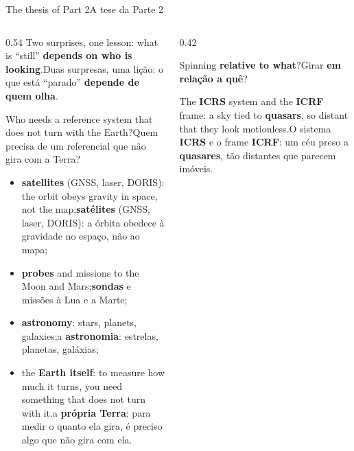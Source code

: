 \documentclass[aspectratio=169,11pt]{beamer}
\newcommand{\tr}[2]{\ifEN#2\else#1\fi}
\newcommand{\bnum}[1]{\textbf{\textcolor{mTeal}{#1}}}
\newcommand{\sist}[1]{\textcolor{corSist}{\textbf{#1}}}
\newcommand{\fram}[1]{\textcolor{corFrame}{\textbf{#1}}}
\begin{document}
\begin{frame}{\tr{A tese da Parte 2}{The thesis of Part 2}}
  \begin{columns}[T]
    \begin{column}{0.54\textwidth}
      \tr{Duas surpresas, uma lição: o que está ``parado'' \bnum{depende de quem olha}.}{Two
      surprises, one lesson: what is ``still'' \bnum{depends on who is looking}.}
      \medskip

      \tr{Quem precisa de um referencial que \alert{não gira com a Terra}?}{Who needs a reference
      system that \alert{does not turn with the Earth}?}
      \small
      \begin{itemize}
        \setlength{\itemsep}{1pt}
        \item \tr{\textbf{satélites} (GNSS, laser, DORIS): a órbita obedece à gravidade no
              espaço, não ao mapa;}{\textbf{satellites} (GNSS, laser, DORIS): the orbit obeys
              gravity in space, not the map;}
        \item \tr{\textbf{sondas} e missões à Lua e a Marte;}{\textbf{probes} and missions to
              the Moon and Mars;}
        \item \tr{a \textbf{astronomia}: estrelas, planetas, galáxias;}{\textbf{astronomy}:
              stars, planets, galaxies;}
        \item \tr{a \textbf{própria Terra}: para medir o quanto ela gira, é preciso algo que
              não gira com ela.}{the \textbf{Earth itself}: to measure how much it turns, you
              need something that does not turn with it.}
      \end{itemize}
    \end{column}
    \begin{column}{0.42\textwidth}
      \begin{regra}[title={\tr{A pergunta que organiza as quatro aulas}{The question that
        organizes the four classes}}]
        \centering\large \tr{Girar \textbf{em relação a quê}?}{Spinning \textbf{relative to
        what}?}
      \end{regra}
      \medskip
      \begin{ideia}[title={\tr{Aonde vamos chegar}{Where we are headed}}]
        \small\tr{O sistema \sist{ICRS} e o frame \fram{ICRF}: um céu preso a \bnum{quasares},
        tão distantes que parecem imóveis.}{The \sist{ICRS} system and the \fram{ICRF} frame: a
        sky tied to \bnum{quasars}, so distant that they look motionless.}
      \end{ideia}
    \end{column}
  \end{columns}
\end{frame}
\end{document}
